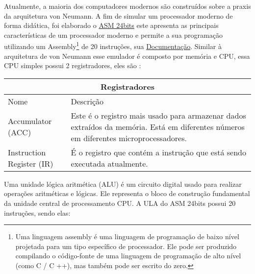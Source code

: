 Atualmente, a maioria dos computadores modernos são construídos sobre a praxis da arquitetura von Neumann. A fim de simular um processador moderno de forma didática, foi elaborado o \href{https://gzsig.io/vm-24bits/}{ASM 24bits} este apresenta as principais características de um processador moderno e permite a sua programação utilizando um Assembly\footnote{Uma linguagem assembly é uma linguagem de programação de baixo nível projetada para um tipo específico de processador. Ele pode ser produzido compilando o código-fonte de uma linguagem de programação de alto nível (como C / C ++), mas também pode ser escrito do zero.} de 20 instruções, sua \href{https://github.com/gzsig/Asm/blob/master/README.md}{Documentação}. Similar à arquitetura de von Neumann esse emulador é composto por memória e CPU, essa CPU simples possui 2 registradores, eles são :

\vspace{1cm}
\begin{longtable}{ |p{3cm}||p{11cm}|  }
  \hline
  \multicolumn{2}{|c|}{Registradores} \\
  \hline
    Nome &
    Descrição\\
  \hline
    Accumulator (ACC) &Este é o registro mais usado para armazenar dados extraídos da memória. Está em diferentes números em diferentes microprocessadores.\\
  \hline
    Instruction Register (IR) &É o registro que contém a instrução que está sendo executada atualmente.\\
  \hline
\end{longtable}
\vspace{1cm}

Uma unidade lógica aritmética (ALU) é um circuito digital usado para realizar operações aritméticas e lógicas. Ele representa o bloco de construção fundamental da unidade central de processamento CPU. A ULA do ASM 24bits possui 20 instruções, sendo elas:


